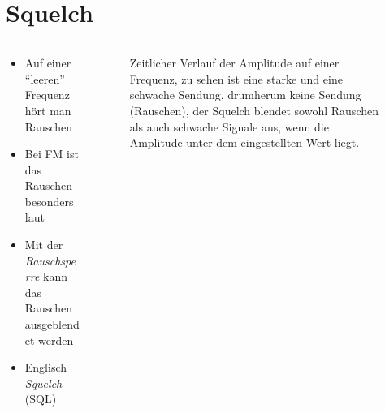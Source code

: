 
\section{Squelch}
\label{section:squelch}
\begin{frame}%

\begin{columns}
    \begin{column}{0.48\textwidth}
    \begin{itemize}
  \item Auf einer \enquote{leeren} Frequenz hört man Rauschen
  \item Bei FM ist das Rauschen besonders laut
  \item Mit der \emph{Rauschsperre} kann das Rauschen ausgeblendet werden
  \item Englisch \emph{Squelch} (SQL)
  \end{itemize}

    \end{column}
   \begin{column}{0.48\textwidth}
       
\begin{figure}
    \caption{\scriptsize Zeitlicher Verlauf der Amplitude auf einer Frequenz, zu sehen ist eine starke und eine schwache Sendung, drumherum keine Sendung (Rauschen), der Squelch blendet sowohl Rauschen als auch schwache Signale aus, wenn die Amplitude unter dem eingestellten Wert liegt.}
    \label{squelch}
\end{figure}


   \end{column}
\end{columns}

\end{frame}

\begin{frame}
\end{frame}%
